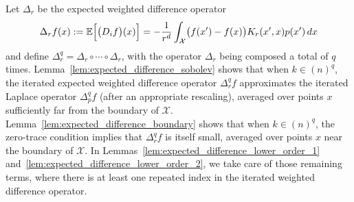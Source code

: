 \documentclass{article}
\newcommand{\1}{\mathbf{1}}
\newcommand{\Xset}{\mathcal{X}}
\newcommand{\Ebb}{\mathbb{E}}
\theoremstyle{alden}
\theoremstyle{aldenthm}
\theoremstyle{definition}
\theoremstyle{remark}
\begin{document}
Let $\Delta_r$ be the expected weighted difference operator
\begin{equation}
\Delta_rf(x) := \Ebb\Bigl[\bigl(D_if\bigr)(x)\Bigr] = -\frac{1}{r^d}\int_{\Xset} \bigl(f(x') - f(x)\bigr) K_r(x',x) p(x') \,dx
\end{equation}
and define $\Delta_r^q = \Delta_r \circ \cdots \circ \Delta_r$, with the operator $\Delta_r$ being composed a total of $q$ times. Lemma~\ref{lem:expected_difference_sobolev} shows that when $k \in (n)^q$, the iterated expected weighted difference operator $\Delta_r^qf$ approximates the iterated Laplace operator $\Delta_p^qf$ (after an appropriate rescaling), averaged over points $x$ sufficiently far from the boundary of $\Xset$. Lemma~\ref{lem:expected_difference_boundary} shows that when $k \in (n)^q$, the zero-trace condition implies that $\Delta_r^qf$ is itself small, averaged over points $x$ near the boundary of $\Xset$. In Lemmas~\ref{lem:expected_difference_lower_order_1} and~\ref{lem:expected_difference_lower_order_2}, we take care of those remaining terms, where there is at least one repeated index in the iterated weighted difference operator.
\end{document}
